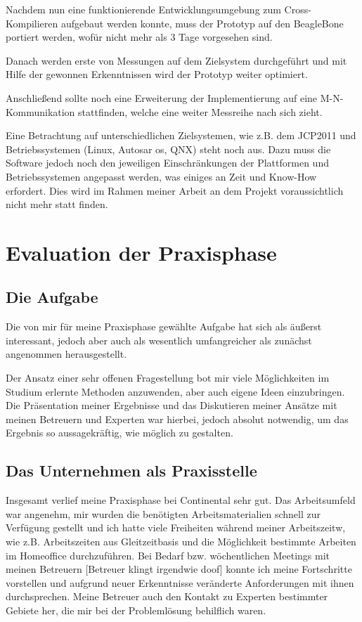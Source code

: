 Nachdem nun eine funktionierende Entwicklungsumgebung zum Cross-Kompilieren aufgebaut werden konnte, muss der Prototyp auf den BeagleBone portiert werden, wofür nicht mehr als 3 Tage vorgesehen sind. 

Danach werden erste von Messungen auf dem Zielsystem durchgeführt und mit Hilfe der gewonnen Erkenntnissen wird der Prototyp weiter optimiert. 

Anschließend sollte noch eine Erweiterung der Implementierung auf eine M-N-Kommunikation stattfinden, welche eine weiter Messreihe nach sich zieht.

Eine Betrachtung auf unterschiedlichen Zielsystemen, wie z.B. dem JCP2011 und Betriebssystemen (Linux, Autosar os, QNX) steht noch aus. Dazu muss die Software jedoch noch den jeweiligen Einschränkungen der Plattformen und Betriebssystemen angepasst werden, was einiges an Zeit und Know-How erfordert. Dies wird im Rahmen meiner Arbeit an dem Projekt voraussichtlich nicht mehr statt finden. 

\section{Evaluation der Praxisphase}
\subsection{Die Aufgabe}
Die von mir für meine Praxisphase gewählte Aufgabe hat sich als äußerst interessant, jedoch aber auch als wesentlich umfangreicher als zunächst angenommen herausgestellt. 

Der Ansatz einer sehr offenen Fragestellung bot mir  viele Möglichkeiten im Studium erlernte Methoden anzuwenden, aber auch eigene Ideen einzubringen. Die Präsentation meiner Ergebnisse und das Diskutieren meiner Ansätze mit meinen Betreuern und Experten war hierbei, jedoch absolut notwendig, um das Ergebnis so aussagekräftig, wie möglich zu gestalten.



\subsection{Das Unternehmen als Praxisstelle}

Insgesamt verlief meine Praxisphase bei Continental sehr gut. Das Arbeitsumfeld war angenehm, mir wurden die benötigten Arbeitsmaterialien schnell zur Verfügung gestellt und ich hatte viele Freiheiten während meiner Arbeitszeitw, wie z.B. Arbeitszeiten aus Gleitzeitbasis und die Möglichkeit bestimmte Arbeiten im Homeoffice durchzuführen. 
Bei Bedarf bzw. wöchentlichen Meetings mit meinen Betreuern [Betreuer klingt irgendwie doof] konnte ich meine Fortschritte vorstellen und aufgrund neuer Erkenntnisse veränderte Anforderungen mit ihnen durchsprechen. Meine Betreuer auch den Kontakt zu Experten bestimmter Gebiete her, die mir bei der Problemlösung behilflich waren. 

